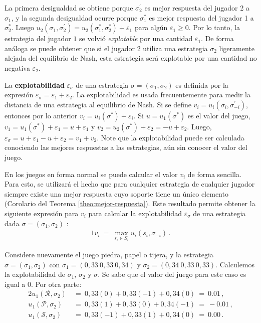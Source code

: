 La primera desigualdad se obtiene porque $\sigma^{\prime}_2$ es mejor respuesta del jugador 2 a $\sigma_1$, y la segunda desigualdad ocurre porque $\sigma^*_1$ es mejor respuesta del jugador 1 a $\sigma^*_2$. Luego $u_2(\sigma_1, \sigma^{\prime}_2) = u_2(\sigma^*_1, \sigma^*_2) + \varepsilon_1$ para algún $\varepsilon_1 \geq 0$. Por lo tanto, la estrategia del jugador $1$ se volvió \textit{explotable} por una cantidad $\varepsilon_1$. De forma análoga se puede obtener que si el jugador $2$ utiliza una estrategia $\sigma_2$ ligeramente alejada del equilibrio de Nash, esta estrategia será explotable por una cantidad no negativa $\varepsilon_2$.

La \textbf{explotabilidad} \cite[p. 7]{bib:thesis-marc-lanctot} $\varepsilon_\sigma$ de una estrategia $\sigma = (\sigma_1, \sigma_2)$ es definida por la expresión $\varepsilon_{\sigma} = \varepsilon_1 + \varepsilon_2$. La explotabilidad es usada frecuentemente para medir la distancia de una estrategia al equilibrio de Nash. Si se define $v_i = u_i(\sigma_i, \sigma^{\prime}_{-i})$, entonces por lo anterior $v_i = u_i(\sigma^*) + \varepsilon_i$. Si $u=u_1(\sigma^*)$ es el valor del juego,  $v_1 = u_1(\sigma^*) + \varepsilon_1 = u + \varepsilon_1$ y $v_2 = u_2(\sigma^*) + \varepsilon_2 = -u + \varepsilon_2$. Luego, $\varepsilon_{\sigma} = u + \varepsilon_1 - u + \varepsilon_2 =  v_1 + v_2$. Note que la explotabilidad puede ser calculada conociendo las mejores respuestas a las estrategias, aún sin conocer el valor del juego.

En los juegos en forma normal se puede calcular el valor $v_i$ de forma sencilla. Para esto, se utilizará el hecho que para cualquier estrategia de cualquier jugador siempre existe una mejor respuesta cuyo soporte tiene un único elemento (Corolario del Teorema \ref{theo:mejor-respuesta}). Este resultado permite obtener la siguiente expresión para $v_i$ para calcular la explotabilidad $\varepsilon_\sigma$ de una estrategia dada $\sigma=(\sigma_1,\sigma_2)$ \cite[p.~60]{bib:thesis-marc-lanctot}:
\begin{alignat}{1}
\label{eq:best-response-fn}
v_i\ =\ \max_{s_{i} \in S_{i}} u_i(s_i, \sigma_{-i}) \,.
\end{alignat}

Considere nuevamente el juego piedra, papel o tijera, y la estrategia $\sigma = (\sigma_1, \sigma_2)$ con $\sigma_1 = (0,33\ 0,33\ 0,34)$ y $\sigma_2 = (0,34\ 0,33\ 0,33)$. Calculemos la explotabilidad de $\sigma_1$, $\sigma_2$ y $\sigma$. Se sabe que el valor del juego para este caso es igual a $0$. Por otra parte:
\begin{alignat}{2}
u_1(\mathcal{R}, \sigma_2)\ &=\ 0,33(0)  +  0,33(-1) +  0,34(0)\  =\  0.01 \,, \\
u_1(\mathcal{P}, \sigma_2)\ &=\ 0,33(1)  +   0,33(0) +  0,34(-1)\ =\ -0.01 \,, \\
u_1(\mathcal{S}, \sigma_2)\ &=\ 0,33(-1) +   0,33(1) +  0,34(0)\  =\  0.00 \,.
\end{alignat}

